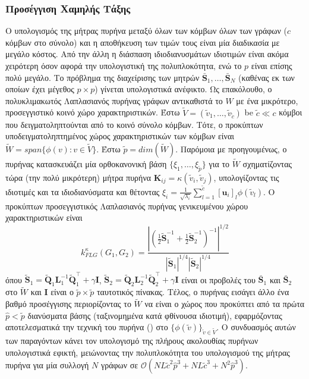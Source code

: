 \subsubsection{Προσέγγιση Χαμηλής Τάξης}
Ο υπολογισμός της μήτρας πυρήνα μεταξύ όλων των κόμβων όλων των γράφων ($c$ κόμβων στο σύνολο) και η αποθήκευση των τιμών τους είναι μία διαδικασία με μεγάλο κόστος.
Από την άλλη η διάσπαση ιδιοδιανυσμάτων ιδιοτιμών είναι ακόμα χειρότερη όσον αφορά την υπολογιστική της πολυπλοκότητα, ενώ το $p$ είναι επίσης πολύ μεγάλο.
Το πρόβλημα της διαχείρισης των μητρών $\bar{\mathbf{S}}_1, \ldots, \bar{\mathbf{S}}_N$ (καθένας εκ των οποίων έχει μέγεθος $p \times p$) γίνεται υπολογιστικά ανέφικτο.
Ως επακόλουθο, ο πολυκλιμακωτός Λαπλασιανός πυρήνας γράφων αντικαθιστά το $W$ με ένα μικρότερο, προσεγγιστικό κοινό χώρο χαρακτηριστικών.
Έστω $\tilde{V} = (\tilde{v}_1, \ldots, \tilde{v}_{\tilde{c}})$ be $\tilde{c} \ll c$ κόμβοι που δειγματοληπτούνται από το κοινό σύνολο κόμβων.
Τότε, ο προκύπτων υποδειγματοληπτημένος χώρος χαρακτηριστικών των κόμβων είναι $\tilde{W} = span \{ \phi(v) : v \in \tilde{V} \}$.
Έστω $\tilde{p} = dim(\tilde{W})$.
Παρόμοια με προηγουμένως, ο πυρήνας κατασκευάζει μία ορθοκανονική βάση $\{ \xi_1, \ldots, \xi_{\tilde{p}} \}$ για το $\tilde{W}$ σχηματίζοντας τώρα (την πολύ μικρότερη) μήτρα πυρήνα $\mathbf{K}_{ij} = \kappa(\tilde{v}_i, \tilde{v}_j)$, υπολογίζοντας τις ιδιοτιμές και τα ιδιοδιανύσματα και θέτοντας $\xi_i = \frac{1}{\sqrt{\lambda_i}} \sum_{l=1}^{\tilde{c}} [\mathbf{u}_i]_l \phi(\tilde{v}_l)$. 
Ο προκύπτων προσεγγιστικός Λαπλασιανός πυρήνας γενικευμένου χώρου χαρακτηριστικών είναι
\begin{equation}
    k_{FLG}^\kappa(G_1, G_2) = \frac{| (\frac{1}{2} \tilde{\mathbf{S}}_1^{-1} + \frac{1}{2} \tilde{\mathbf{S}}_2^{-1} )^{-1} |^{1/2}}{|\tilde{\mathbf{S}}_1|^{1/4} |\tilde{\mathbf{S}}_2|^{1/4}} 
\end{equation}
όπου $\tilde{\mathbf{S}}_1 = \tilde{\mathbf{Q}}_1 \mathbf{L}_1^{-1} \tilde{\mathbf{Q}}_1^\top + \gamma \mathbf{I}$, $\tilde{\mathbf{S}}_2 = \tilde{\mathbf{Q}}_2 \mathbf{L}_2^{-1} \tilde{\mathbf{Q}}_2^\top + \gamma \mathbf{I}$ είναι οι προβολές του $\bar{\mathbf{S}}_1$ και $\bar{\mathbf{S}}_2$ στο $\tilde{W}$ και $\mathbf{I}$ είναι ο $\tilde{p} \times \tilde{p}$ ταυτοτικός πίνακας.
Τέλος, ο πυρήνας εισάγει άλλο ένα βαθμό προσέγγισης περιορίζοντας το $\tilde{W}$ να είναι ο χώρος που προκύπτει από τα πρώτα $\hat{p} < \tilde{p}$ διανύσματα βάσης (ταξινομημένα κατά φθίνουσα ιδιοτιμή), εφαρμόζοντας αποτελεσματικά την τεχνική του  πυρήνα () στο $\{ \phi(\tilde{v}) \}_{\tilde{v} \in \tilde{V}}$.
Ο συνδυασμός αυτών των παραγόντων κάνει τον υπολογισμό της πλήρους ακολουθίας πυρήνων υπολογιστικά εφικτή, μειώνοντας την πολυπλοκότητα του υπολογισμού της μήτρας πυρήνα για μία συλλογή $N$ γράφων σε $\mathcal{O}(NL \tilde{c}^2 \hat{p}^3 + NL \tilde{c}^3 + N^2 \hat{p}^3)$.

